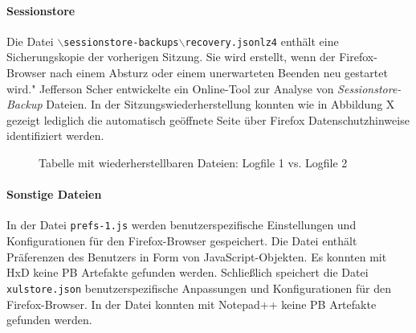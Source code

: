 \paragraph*{Sessionstore}
Die Datei \texttt{$\backslash$sessionstore-backups$\backslash$recovery.jsonlz4} enthält eine Sicherungskopie der vorherigen Sitzung. Sie wird erstellt, wenn der Firefox-Browser nach einem Absturz oder einem unerwarteten Beenden neu gestartet wird." %
Jefferson Scher entwickelte ein Online-Tool zur Analyse von \textit{Sessionstore-Backup} Dateien.
In der Sitzungswiederherstellung konnten wie in Abbildung X gezeigt lediglich die automatisch geöffnete Seite über Firefox Datenschutzhinweise identifiziert werden.
\begin{figure}[h!]
	\caption{Tabelle mit wiederherstellbaren Dateien: Logfile 1 vs. Logfile 2}
\end{figure}

\paragraph*{Sonstige Dateien}
In der Datei \texttt{prefs-1.js} werden benutzerspezifische Einstellungen und Konfigurationen für den Firefox-Browser gespeichert. Die Datei enthält Präferenzen des Benutzers in Form von JavaScript-Objekten. Es konnten mit HxD keine PB Artefakte gefunden werden.
Schließlich speichert die Datei \texttt{xulstore.json} benutzerspezifische Anpassungen und Konfigurationen für den Firefox-Browser. In der Datei konnten mit Notepad++ keine PB Artefakte gefunden werden.
	
